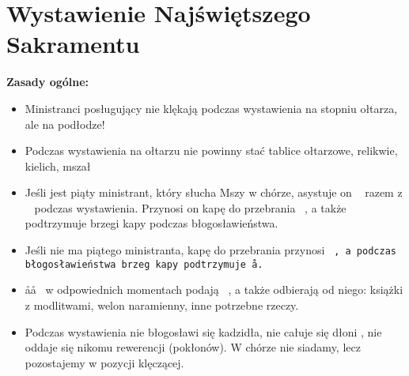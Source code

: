 	\section{Wystawienie Najświętszego Sakramentu}
	
	
		\textbf{Zasady ogólne:}
		\begin{itemize}
			\item Ministranci posługujący nie klękają podczas wystawienia na stopniu ołtarza, ale na podłodze!
			\item Podczas wystawienia na ołtarzu nie powinny stać tablice ołtarzowe, relikwie, kielich, mszał
			\item Jeśli jest piąty ministrant, który słucha Mszy w chórze, asystuje on \ii~ razem z \cc~ podczas wystawienia. Przynosi on kapę do przebrania \ii~, a także podtrzymuje brzegi kapy podczas błogosławieństwa.
			\item Jeśli nie ma piątego ministranta, kapę do przebrania przynosi \tt~, a podczas błogosławieństwa brzeg kapy podtrzymuje \aa.
			\item \aa\aa~ w odpowiednich momentach podają \cc~, a także odbierają od niego: książki z modlitwami, welon naramienny, inne potrzebne rzeczy.
			\item Podczas wystawienia nie błogosławi się kadzidła, nie całuje się dłoni \ii, nie oddaje się nikomu rewerencji (pokłonów). W chórze nie siadamy, lecz pozostajemy w pozycji klęczącej.	
		\end{itemize}
	
